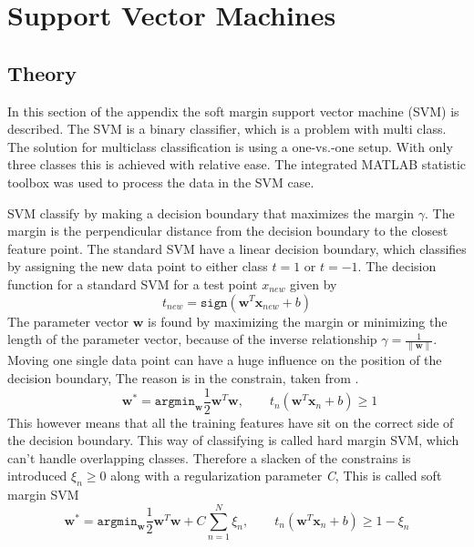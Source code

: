 \chapter{Support Vector Machines}
\section{Theory}

In this section of the appendix the soft margin support vector machine (SVM) is described. The SVM is a binary classifier, which is a problem with multi class. 
The solution for multiclass classification is using a one-vs.-one setup.
With only three classes this is achieved with relative ease. 
The integrated MATLAB statistic toolbox was used to process the data in the SVM case. 

SVM classify by making a decision boundary that maximizes the margin $ \gamma $.
The margin is the perpendicular distance from the decision boundary to the closest feature point.
The standard SVM have a linear decision boundary, which classifies by assigning the new data point to either class $ t=1 $ or $ t=-1 $. 
The decision function for a standard SVM for a test point $ x_{new} $ given by
\begin{equation}
t_{new} = \mathtt{sign}(\mathbf{w}^T \mathbf{x}_{new} +b)
\label{eq:SVM_lin}
\end{equation}
The parameter vector $ \mathbf{w} $ is found by maximizing the margin or minimizing the length of the parameter vector, because of the inverse relationship $ \gamma = \frac{1}{\|\mathbf{w}\|} $.
Moving one single data point can have a huge influence on the position of the decision boundary, The reason is in the constrain, taken from \cite{SVM:PDF}.
\begin{equation}
\qquad \mathbf{w}^* =
\mathtt{argmin}_\mathbf{w} \frac{1}{2} \mathbf{w}^T \mathbf{w}, 
\qquad t_n(\mathbf{w}^T \mathbf{x}_n + b) \geq 1
\end{equation}   
This however means that all the training features have sit on the correct side of the decision boundary.
This way of classifying is called hard margin SVM, which can't handle overlapping classes.
Therefore a slacken of the constrains is introduced $ \xi_n \geq 0 $ along with a regularization parameter \textit{C}, This is called soft margin SVM
\begin{equation}
\mathbf{w}^* = 
\mathtt{argmin}_\mathbf{w} \frac{1}{2} \mathbf{w}^T \mathbf{w}+C \sum_{n=1}^{N} \xi_n, \qquad t_n(\mathbf{w}^T \mathbf{x}_n + b) \geq 1-\xi_n
\end{equation} 
